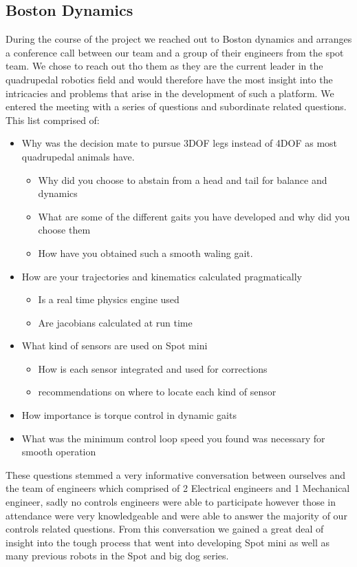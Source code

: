 \subsection{Boston Dynamics}
    During the course of the project we reached out to Boston dynamics and arranges a conference call between our team and a group of their engineers from the spot team. We chose to reach out tho them as they are the current leader in the quadrupedal robotics field and would therefore have the most insight into the intricacies and problems that arise in the development of such a platform. We entered the meeting with a series of questions and subordinate related questions. This list comprised of:
    \begin{itemize}
        \item Why was the decision mate to pursue 3DOF legs instead of 4DOF as most quadrupedal animals have. 
        \begin{itemize}
            \item Why did you choose to abstain from a head and tail for balance and dynamics
            \item What are some of the different gaits you have developed and why did you choose them
            \item How have you obtained such a smooth waling gait.
        \end{itemize}
        \item How are your trajectories and kinematics calculated pragmatically
            \begin{itemize}
                \item Is a real time physics engine used
                \item Are jacobians calculated at run time
            \end{itemize}
        \item What kind of sensors are used on Spot mini
            \begin{itemize}
                \item How is each sensor integrated and used for corrections
                \item recommendations on where to locate each kind of sensor
            \end{itemize}
        \item How importance is torque control in dynamic gaits
        \item What was the minimum control loop speed you found was necessary for smooth operation
    \end{itemize}
These questions stemmed a very informative conversation between ourselves and the team of engineers which comprised of 2 Electrical engineers and 1 Mechanical engineer, sadly no controls engineers were able to participate however those in attendance were very knowledgeable and were able to answer the majority of our controls related questions. From this conversation we gained a great deal of insight into the tough process that went into developing Spot mini as well as many previous robots in the Spot and big dog series.  

